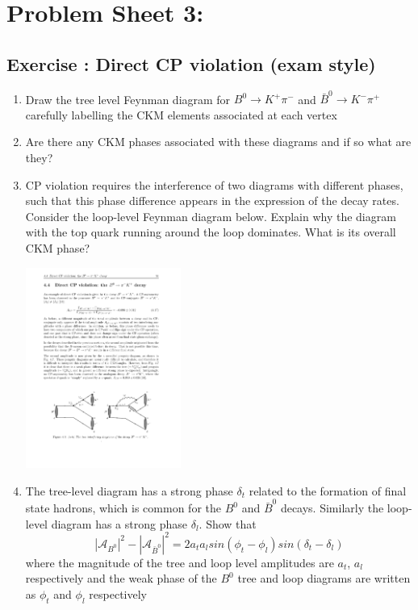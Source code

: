 \section*{Problem Sheet 3:}
\label{sec:ps3}
\setcounter{psThreeQuestions}{0}
\renewcommand{\NewQuestion}[1]{\subsection*{Exercise : #1}}

\NewQuestion{Direct CP violation (exam style)}
\begin{enumerate}
\item Draw the tree level Feynman diagram for $B^0\to K^+\pi^-$
and $\bar{B}^0\to K^-\pi^+$ carefully labelling the CKM elements associated at each vertex
\item Are there any CKM phases associated with these diagrams and if so what are they?
\item CP violation requires the interference of two diagrams with different phases, such that this phase difference appears in the expression of the decay rates. Consider the loop-level Feynman diagram below. Explain why the diagram with the top quark running around the loop dominates. What is its overall CKM phase?
\begin{center}
\includegraphics[width=0.4\textwidth]{problemsheets/fig/b_kpi_penguin.pdf}
\end{center}
\item The tree-level diagram has a strong phase $\delta_t$ related to the formation of final state hadrons, which is common for the $B^0$ and $\bar{B}^0$ decays. Similarly the loop-level diagram has a strong phase $\delta_l$. Show that
\[|\mathcal{A}_{B^0}|^2-|\mathcal{A}_{\bar{B}^0}|^2=2a_{t}a_{l}sin(\phi_t-\phi_l)sin(\delta_t-\delta_l)\]
where the magnitude of the tree and loop level amplitudes are $a_t$, $a_l$ respectively and the weak phase of the $B^0$ tree and loop diagrams are written as $\phi_t$ and $\phi_l$ respectively
\end{enumerate}

